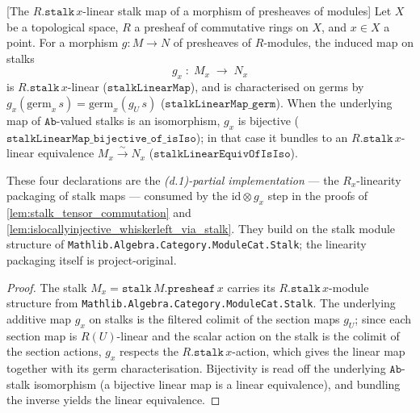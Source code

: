\begin{lemma}

\leanok

[The $R.\mathtt{stalk}\,x$-linear stalk map of a morphism of presheaves of modules]
  \label{lem:stalk_linear_map}
  Let \(X\) be a topological space, \(R\) a presheaf of commutative rings on
  \(X\), and \(x \in X\) a point. For a morphism \(g : M \to N\) of presheaves of
  \(R\)-modules, the induced map on stalks
  \[
    g_x \;\colon\; M_x \;\longrightarrow\; N_x
  \]
  is \(R.\mathtt{stalk}\,x\)-linear (\(\mathtt{stalkLinearMap}\)), and is
  characterised on germs by
  \(g_x(\mathrm{germ}_x\,s) = \mathrm{germ}_x(g_U\,s)\)
  (\(\mathtt{stalkLinearMap\_germ}\)). When the underlying map of
  \(\mathtt{Ab}\)-valued stalks is an isomorphism, \(g_x\) is bijective
  (\(\mathtt{stalkLinearMap\_bijective\_of\_isIso}\)); in that case it bundles to
  an \(R.\mathtt{stalk}\,x\)-linear equivalence
  \(M_x \xrightarrow{\sim} N_x\) (\(\mathtt{stalkLinearEquivOfIsIso}\)).

  These four declarations are the \emph{(d.1)-partial implementation} --- the
  \(R_x\)-linearity packaging of stalk maps --- consumed by the
  \(\mathrm{id} \otimes g_x\) step in the proofs of
  \cref{lem:stalk_tensor_commutation} and
  \cref{lem:islocallyinjective_whiskerleft_via_stalk}. They build on the
  stalk module structure of \texttt{Mathlib.Algebra.Category.ModuleCat.Stalk};
  the linearity packaging itself is project-original.
\end{lemma}

\begin{proof}
  \leanok
  The stalk \(M_x = \mathtt{stalk}\,M.\mathtt{presheaf}\,x\) carries its
  \(R.\mathtt{stalk}\,x\)-module structure from
  \texttt{Mathlib.Algebra.Category.ModuleCat.Stalk}. The underlying additive map
  \(g_x\) on stalks is the filtered colimit of the section maps \(g_U\); since
  each section map is \(R(U)\)-linear and the scalar action on the stalk is the
  colimit of the section actions, \(g_x\) respects the
  \(R.\mathtt{stalk}\,x\)-action, which gives the linear map together with its
  germ characterisation. Bijectivity is read off the underlying
  \(\mathtt{Ab}\)-stalk isomorphism (a bijective linear map is a linear
  equivalence), and bundling the inverse yields the linear equivalence.
\end{proof}

